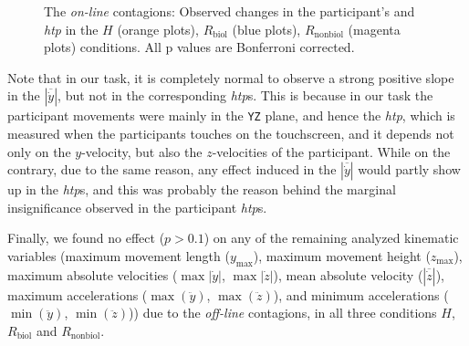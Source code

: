 \begin{figure}[t]
	\caption{The \textit{on-line} contagions: Observed changes in the participant's  and \textit{htp} in the $\textit{H}$ (orange plots), $\textit{R}_{\text{biol}}$ (blue plots), $\textit{R}_{\text{nonbiol}}$ (magenta plots) conditions. All p values are Bonferroni corrected.}
	\label{fig:online}
\end{figure}

Note that in our task, it is completely normal to observe a strong positive slope in the $|\overline{\dot{y}}|$, but not in the corresponding {\it htp}s. This is because in our task the participant movements were mainly in the \texttt{YZ} plane, and hence the {\it htp}, which is measured when the participants touches on the touchscreen, and it depends not only on the $y$-velocity, but also the $z$-velocities of the participant. While on the contrary, due to the same reason, any effect induced in the $|\overline{\dot{y}}|$ would partly show up in the {\it htp}s, and this was probably the reason behind the marginal insignificance observed in the participant {\it htp}s.

Finally, we found no effect ($p > 0.1$) on any of the remaining analyzed kinematic variables (maximum movement length ($y_{\max}$), maximum movement height ($z_{\max}$), maximum absolute velocities ($\max|\dot{y}|$, $\max|\dot{z}|$), mean absolute velocity ($|\overline{\dot{z}}|$), maximum accelerations ($\max(\ddot{y})$, $\max(\ddot{z})$), and minimum accelerations ($\min(\ddot{y})$, $\min(\ddot{z})$)) due to the \textit{off-line} contagions, in all three conditions $H$, $R_{\text{biol}}$ and $R_{\text{nonbiol}}$.


